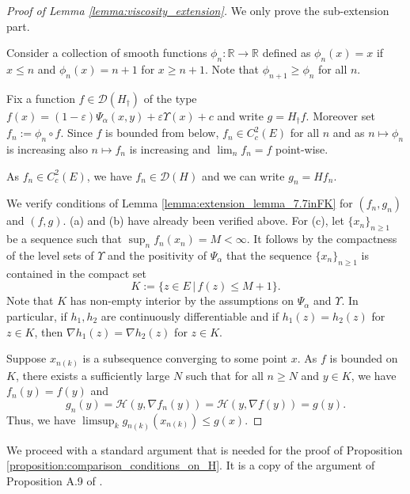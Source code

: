 \documentclass[a4paper]{article}
\newcommand{\cD}{\mathcal{D}}
\newcommand{\cH}{\mathcal{H}}
\newcommand{\bR}{\mathbb{R}}
\numberwithin{equation}{section}
\theoremstyle{definition}
\begin{document}
\begin{proof}[Proof of Lemma \ref{lemma:viscosity_extension}]
	We only prove the sub-extension part. 
	
	Consider a collection of smooth functions $\phi_n : \bR \rightarrow \bR$ defined as $\phi_n(x) = x$ if $x \leq n$ and $\phi_n(x) = n+1$ for $x \geq n+1$. Note that $\phi_{n + 1} \geq \phi_n$ for all $n$.
	
	\smallskip
	
	Fix a function $f \in \cD(H_\dagger)$ of the type $f(x) = (1-\varepsilon)\Psi_\alpha(x,y)+\varepsilon \Upsilon(x) + c$ and write $g = H_\dagger f$. Moreover set $f_n := \phi_n \circ f$. Since $f$ is bounded from below, $f_n \in C_c^2(E)$ for all $n$ and as $n \mapsto \phi_n$ is increasing also $n \mapsto f_n$ is increasing and $\lim_n f_n = f$ point-wise.
	
	As $f_n \in C_c^2(E)$, we have $f_n \in \cD(H)$ and we can write $g_n = H f_n$.
	
	We verify conditions of Lemma \ref{lemma:extension_lemma_7.7inFK} for $(f_n,g_n)$ and $(f,g)$. (a) and (b) have already been verified above. For (c), let $\{x_n\}_{n \geq 1}$ be a sequence such that $\sup_n f_n(x_n) = M < \infty$. It follows by the compactness of the level sets of $\Upsilon$ and the positivity of $\Psi_\alpha$ that the sequence $\{x_n\}_{n \geq 1}$ is contained in the compact set 
	\begin{equation*}
		K := \{z \in E \, | \, f(z) \leq M+1\}.
	\end{equation*}
	Note that $K$ has non-empty interior by the assumptions on $\Psi_\alpha$ and $\Upsilon$. In particular, if $h_1,h_2$ are continuously differentiable and if $h_1(z) = h_2(z)$ for $z \in K$, then $\nabla h_1(z) = \nabla h_2(z)$ for $z \in K$.
	
	Suppose $x_{n(k)}$ is a subsequence converging to some point $x$. As $f$ is bounded on $K$,  there exists a sufficiently large $N$ such that for all $n \geq N$ and $y \in K$, we have $f_n(y) = f(y)$ and 
	\begin{equation*}
		g_n(y) = \cH(y,\nabla f_n(y)) = \cH(y,\nabla f(y)) = g(y).
	\end{equation*}
	Thus, we have $\limsup_{k} g_{n(k)}(x_{n(k)}) \leq g(x)$.
\end{proof}


We proceed with a standard argument that is needed for the proof of Proposition \ref{proposition:comparison_conditions_on_H}. It is a copy of the argument of Proposition A.9 of \cite{CoKr17}.
\end{document}
